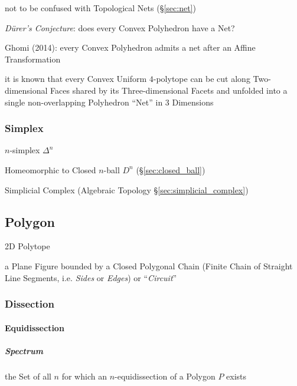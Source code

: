 \fist not to be confused with Topological Nets (\S\ref{sec:net})

\emph{D\"urer's Conjecture}: does every Convex Polyhedron have a Net?

Ghomi (2014): every Convex Polyhedron admits a net after an Affine
Transformation

it is known that every Convex Uniform $4$-polytope can be cut along
Two-dimensional Faces shared by its Three-dimensional Facets and unfolded into
a single non-overlapping Polyhedron ``Net'' in $3$ Dimensions



\subsubsection{Simplex}\label{sec:simplex}

$n$-simplex $\Delta^n$

Homeomorphic to Closed $n$-ball $D^n$ (\S\ref{sec:closed_ball})

\fist Simplicial Complex (Algebraic Topology \S\ref{sec:simplicial_complex})



\subsection{Polygon}\label{sec:polygon}

2D Polytope

a Plane Figure bounded by a Closed Polygonal Chain (Finite Chain of Straight
Line Segments, i.e. \emph{Sides} or \emph{Edges}) or ``\emph{Circuit}''



\subsubsection{Dissection}\label{sec:dissection}

\paragraph{Equidissection}\label{sec:equidissection}\hfill

\subparagraph{Spectrum}\label{sec:polygon_spectrum}\hfill

the Set of all $n$ for which an $n$-equidissection of a Polygon $P$ exists




